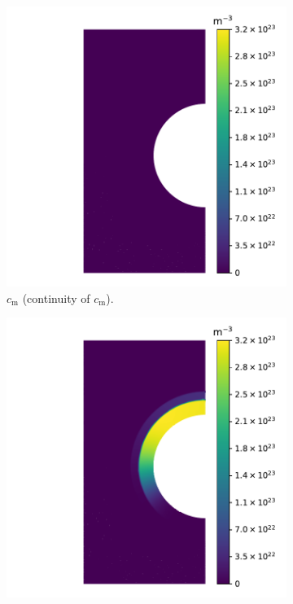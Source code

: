 \begin{figure}
    \centering
    \begin{subfigure}{0.5\linewidth}
        \centering
        \includegraphics[width=\linewidth]{Figures/Chapter3/monoblocks/interface_condition/iter case/mobile_concentration.pdf}
        \caption{$c_\mathrm{m}$ (continuity of $c_\mathrm{m}$).}
    \end{subfigure}%
    \begin{subfigure}{0.5\linewidth}
        \centering
        \includegraphics[width=\linewidth]{Figures/Chapter3/monoblocks/interface_condition/iter case/mobile_chemical_pot.pdf}

\end{subfigure}
\end{figure}
